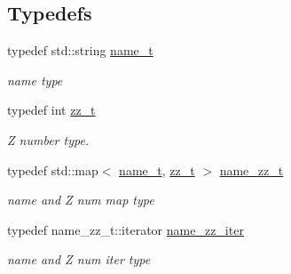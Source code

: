 \subsection*{Typedefs}
\begin{DoxyCompactItemize}
\item 
\mbox{\label{namespacepyne_1_1nucname_aed6b656cde69b79b33f6af37fabb2054}} 
typedef std\+::string \hyperlink{namespacepyne_1_1nucname_aed6b656cde69b79b33f6af37fabb2054}{name\+\_\+t}
\begin{DoxyCompactList}\small\item\em name type \end{DoxyCompactList}\item 
\mbox{\label{namespacepyne_1_1nucname_afc72282eda03d12bd117fe7a9c956880}} 
typedef int \hyperlink{namespacepyne_1_1nucname_afc72282eda03d12bd117fe7a9c956880}{zz\+\_\+t}
\begin{DoxyCompactList}\small\item\em Z number type. \end{DoxyCompactList}\item 
\mbox{\label{namespacepyne_1_1nucname_a583bbe562afd6de9a7ce77718e17a231}} 
typedef std\+::map$<$ \hyperlink{namespacepyne_1_1nucname_aed6b656cde69b79b33f6af37fabb2054}{name\+\_\+t}, \hyperlink{namespacepyne_1_1nucname_afc72282eda03d12bd117fe7a9c956880}{zz\+\_\+t} $>$ \hyperlink{namespacepyne_1_1nucname_a583bbe562afd6de9a7ce77718e17a231}{name\+\_\+zz\+\_\+t}
\begin{DoxyCompactList}\small\item\em name and Z num map type \end{DoxyCompactList}\item 
\mbox{\label{namespacepyne_1_1nucname_ae8154c4038af2ee6638047dfe08e3c77}} 
typedef name\+\_\+zz\+\_\+t\+::iterator \hyperlink{namespacepyne_1_1nucname_ae8154c4038af2ee6638047dfe08e3c77}{name\+\_\+zz\+\_\+iter}
\begin{DoxyCompactList}\small\item\em name and Z num iter type \end{DoxyCompactList}\item 
\mbox{\label{namespacepyne_1_1nucname_ada82b59dc2e7bf529842a0951cbe0e68}} 

\end{DoxyCompactItemize}
